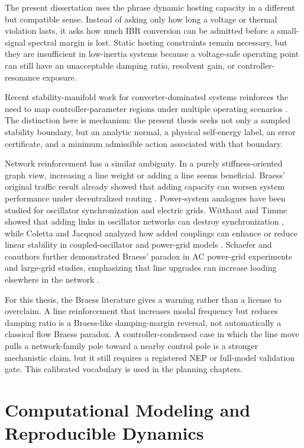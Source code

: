 The present dissertation uses the phrase dynamic hosting capacity in a
different but compatible sense. Instead of asking only how long a voltage or
thermal violation lasts, it asks how much IBR conversion can be admitted before
a small-signal spectral margin is lost. Static hosting constraints remain
necessary, but they are insufficient in low-inertia systems because a
voltage-safe operating point can still have an unacceptable damping ratio,
resolvent gain, or controller-resonance exposure.

Recent stability-manifold work for converter-dominated systems reinforces the
need to map controller-parameter regions under multiple operating scenarios
\cite{conte2026stabilitymanifolds}. The distinction here is mechanism: the
present thesis seeks not only a sampled stability boundary, but an analytic
normal, a physical self-energy label, an error certificate, and a minimum
admissible action associated with that boundary.

Network reinforcement has a similar ambiguity. In a purely stiffness-oriented
graph view, increasing a line weight or adding a line seems beneficial.
Braess' original traffic result already showed that adding capacity can worsen
system performance under decentralized routing \cite{braess2005traffic}.
Power-system analogues have been studied for oscillator synchronization and
electric grids. Witthaut and Timme showed that adding links in oscillator
networks can destroy synchronization \cite{witthaut2012braess}, while Coletta
and Jacquod analyzed how added couplings can enhance or reduce linear
stability in coupled-oscillator and power-grid models \cite{coletta2016braess}.
Schaefer and coauthors further demonstrated Braess' paradox in AC power-grid
experiments and large-grid studies, emphasizing that line upgrades can
increase loading elsewhere in the network \cite{schafer2022braess}.

For this thesis, the Braess literature gives a warning rather than a license
to overclaim. A line reinforcement that increases modal frequency but reduces
damping ratio is a Braess-like damping-margin reversal, not automatically a
classical flow Braess paradox. A controller-condensed case in which the line
move pulls a network-family pole toward a nearby control pole is a stronger
mechanistic claim, but it still requires a registered NEP or full-model
validation gate. This calibrated vocabulary is used in the planning chapters.

\section{Computational Modeling and Reproducible Dynamics}

